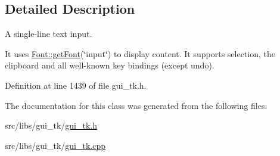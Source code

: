 \subsection{Detailed Description}
A single-\/line text input. 

It uses \hyperlink{classGUI_1_1Font_a19c023d747809a4cfa6142d33bdff53a}{Font\-::get\-Font}(\char`\"{}input\char`\"{}) to display content. It supports selection, the clipboard and all well-\/known key bindings (except undo). 

Definition at line 1439 of file gui\-\_\-tk.\-h.



The documentation for this class was generated from the following files\-:\begin{DoxyCompactItemize}
\item 
src/libs/gui\-\_\-tk/\hyperlink{gui__tk_8h}{gui\-\_\-tk.\-h}\item 
src/libs/gui\-\_\-tk/\hyperlink{gui__tk_8cpp}{gui\-\_\-tk.\-cpp}\end{DoxyCompactItemize}
